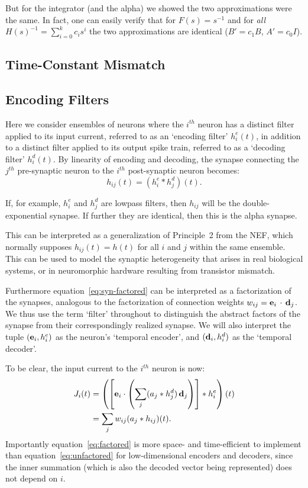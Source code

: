 But for the integrator (and the alpha) we showed the two approximations were the same.
In fact, one can easily verify that for $F(s) = s^{-1}$ and for {\it all} $H(s)^{-1} = \sum_{i=0}^k c_i s^i$ the two approximations are identical ($B' = c_1 B$, $A' = c_0 I$).

\subsection{Time-Constant Mismatch}
\label{sec:mismatch}

\subsection{Encoding Filters}

Here we consider ensembles of neurons where the $i^{th}$ neuron has a distinct filter applied to its input current, referred to as an `encoding filter' $h^e_i(t)$, in addition to a distinct filter applied to its output spike train, referred to as a `decoding filter' $h^d_i(t)$. 
By linearity of encoding and decoding, the synapse connecting the $j^{th}$ pre-synaptic neuron to the $i^{th}$ post-synaptic neuron becomes:
\begin{equation} \label{eq:syn-factored}
h_{ij}(t) = (h^e_i \ast h^d_j)(t) .
\end{equation}

If, for example, $h^e_i$ and $h^d_j$ are lowpass filters, then $h_{ij}$ will be the double-exponential synapse. If further  they are identical, then this is the alpha synapse.

This can be interpreted as a generalization of Principle~2 from the NEF, which normally supposes $h_{ij}(t) = h(t)$ for all $i$ and $j$ within the same ensemble.
This can be used to model the synaptic heterogeneity that arises in real biological systems, or in neuromorphic hardware resulting from transistor mismatch. 

Furthermore equation~\ref{eq:syn-factored} can be interpreted as a factorization of the synapses, analogous to the factorization of connection weights \mbox{$w_{ij} = \mathbf{e}_i \, \cdot \, \mathbf{d}_j$}.
We thus use the term `filter' throughout to distinguish the abstract factors of the synapse from their correspondingly realized synapse.
We will also interpret the tuple $(\mathbf{e}_i, h^e_i)$ as the neuron's `temporal encoder', and $(\mathbf{d}_i, h^d_i)$ as the `temporal decoder'.

To be clear, the input current to the $i^{th}$ neuron is now:
\begin{align}
J_i(t) &= \left( \left[ \mathbf{e}_i \cdot \left( \sum_j ( a_j \ast h^d_j) \, \mathbf{d}_j \right) \right] \ast h^e_i \right)(t) \label{eq:factored} \\
       &= \sum_j w_{ij} (a_j \ast h_{ij})(t) . \label{eq:unfactored}
\end{align}
Importantly equation~\ref{eq:factored} is more space- and time-efficient to implement than equation~\ref{eq:unfactored} for low-dimensional encoders and decoders, since the inner summation (which is also the decoded vector being represented) does not depend on $i$.

